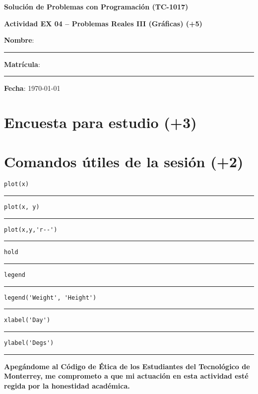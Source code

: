 \documentclass[spanish, 10pt]{article}
\newcommand{\responserule}{{\large\rule{14 cm}{0.3mm}}}
\newcommand{\matlab}[1]{\lstinline[style=Matlab-pyglike]!#1!}
\begin{document}
\begin{center}
	{\Large \textbf{Solución de Problemas con Programación (TC-1017)}}
	
	\bigskip
	{\large \textbf{Actividad EX 04 -- Problemas Reales III (Gráficas) (+5)}}
\end{center}

\bigskip
{\large \textbf{Nombre}: \rule{13.7 cm}{0.4mm}}



\bigskip
{\large \textbf{Matrícula}: \rule{5 cm}{0.4mm}} \hfill {\large \textbf{Fecha}: \today}

\bigskip


\section*{Encuesta para estudio (+3)}

\section*{Comandos útiles de la sesión (+2)}

\matlab{plot(x)} \hfill \\[1.5ex]
\responserule

\bigskip

\matlab{plot(x, y)} \hfill \\[1.5ex]
\responserule

\bigskip

\matlab{plot(x,y,'r--')} \hfill \\[1.5ex]
\responserule

\bigskip

\matlab{hold} \hfill \\[1.5ex]
\responserule

\bigskip

\matlab{legend} \hfill \\[1.5ex]
\responserule

\bigskip

\matlab{legend('Weight', 'Height')} \hfill \\[1.5ex]
\responserule

\bigskip

\matlab{xlabel('Day')} \hfill \\[1.5ex]
\responserule

\bigskip

\matlab{ylabel('Degs')} \hfill \\[1.5ex]
\responserule

\vfill

\textbf{Apegándome al Código de Ética de los Estudiantes del Tecnológico de Monterrey, me comprometo a que mi actuación en esta actividad esté regida por la honestidad académica.}
\end{document}
